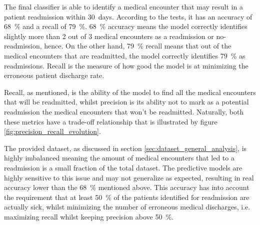 \documentclass[a4paper,11pt]{article}
\begin{document}






The final classifier is able to identify a medical encounter that may result in a patient readmission within \SI{30}{days}. According to the tests, it has an accuracy of \SI{68}{\percent} and a recall of \SI{79}{\percent}. \SI{68}{\percent} accuracy means the model correctly identifies slightly more than \SI{2}{} out of \SI{3}{} medical encounters as a readmission or no-readmission, hence. On the other hand, \SI{79}{\percent} recall means that out of the medical encounters that are readmitted, the model correctly identifies \SI{79}{\percent} as readmissions. Recall is the measure of how good the model is at minimizing the erroneous patient discharge rate.

Recall, as mentioned, is the ability of the model to find all the medical encounters that will be readmitted, whilst precision is its ability not to mark as a potential readmission the medical encounters that won't be readmitted. 
Naturally, both these metrics have a trade-off relationship that is 
illustrated by figure \ref{fig:precision_recall_evolution}.

The provided dataset, as discussed in section \ref{sec:dataset_general_analysis}, is highly imbalanced meaning the amount of medical encounters that led to a readmission is a small fraction of the total dataset. The predictive models are highly sensitive to this issue and may not generalize as expected, 
resulting in real accuracy lower than the \SI{68}{\percent} mentioned above. 
This accuracy has into account the requirement that at least \SI{50}{\percent} of the patients identified  for  readmission are actually sick, whilst minimizing the number of erroneous medical discharges, i.e. maximizing recall whilst keeping precision above \SI{50}{\percent}. 
\end{document}
